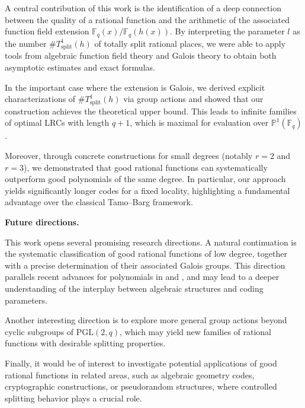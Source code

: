 \documentclass[1p,final]{elsarticle}
\newtheorem{open problem}[theorem]{Open Problem}
\begin{document}
\medskip

A central contribution of this work is the identification of a deep connection between the quality of a rational function and the arithmetic of the associated function field extension $\mathbb{F}_q(x)/\mathbb{F}_q(h(x))$. By interpreting the parameter $l$ as the number $\# T_{\text{split}}^1(h)$ of totally split rational places, we were able to apply tools from algebraic function field theory and Galois theory to obtain both asymptotic estimates and exact formulas.

\medskip

In the important case where the extension is Galois, we derived explicit characterizations of $\# T_{\text{split}}^1(h)$ via group actions and showed that our construction achieves the theoretical upper bound. This leads to infinite families of optimal LRCs with length $q+1$, which is maximal for evaluation over $\mathbb{P}^1(\mathbb{F}_q)$.

\medskip

Moreover, through concrete constructions for small degrees (notably $r=2$ and $r=3$), we demonstrated that good rational functions can systematically outperform good polynomials of the same degree. In particular, our approach yields significantly longer codes for a fixed locality, highlighting a fundamental advantage over the classical Tamo--Barg framework.

\medskip

\noindent
\textbf{Future directions.}

This work opens several promising research directions. A natural continuation is the systematic classification of good rational functions of low degree, together with a precise determination of their associated Galois groups. This direction parallels recent advances for polynomials in \cite{Chen Mesnager zhao2021} and \cite{Duke F M2022}, and may lead to a deeper understanding of the interplay between algebraic structures and coding parameters.

\medskip

Another interesting direction is to explore more general group actions beyond cyclic subgroups of $\mathrm{PGL}(2,q)$, which may yield new families of rational functions with desirable splitting properties.

\medskip

Finally, it would be of interest to investigate potential applications of good rational functions in related areas, such as algebraic geometry codes, cryptographic constructions, or pseudorandom structures, where controlled splitting behavior plays a crucial role.
\end{document}
